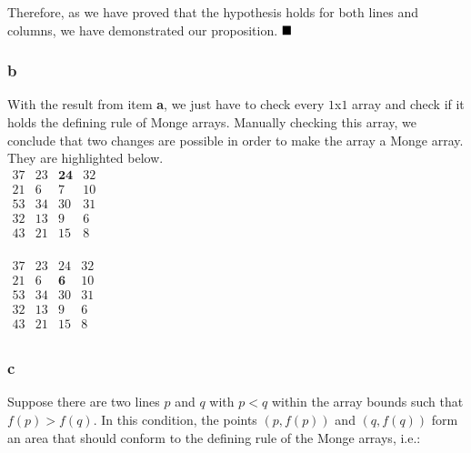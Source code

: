 \documentclass[8pt,a4paper]{article}
\begin{document}
  Therefore, as we have proved that the hypothesis holds for both lines
and columns, we have demonstrated our proposition. $\qed$

\subsubsection*{b}

  With the result from item \textbf{a}, we just have to check every $1$x$1$
array and check if it holds the defining rule of Monge arrays. Manually
checking this array, we conclude that two changes are possible in order
to make the array a Monge array. They are highlighted below. \\

\begin{math}
  \begin{matrix}
    37 & 23 & \mathbf{24} & 32 \\
    21 &  6 &  7          & 10 \\
    53 & 34 & 30          & 31 \\
    32 & 13 &  9          &  6 \\
    43 & 21 & 15          &  8 \\
  \end{matrix}
\end{math}

\vspace{0.5cm}

\begin{math}
  \begin{matrix}
    37 & 23 & 24          & 32 \\
    21 &  6 &  \mathbf{6} & 10 \\
    53 & 34 & 30          & 31 \\
    32 & 13 &  9          &  6 \\
    43 & 21 & 15          &  8 \\
  \end{matrix}
\end{math}

\subsubsection*{c}

  Suppose there are two lines $p$ and $q$ with $p < q$ within the array bounds
such that $f(p) > f(q)$. In this condition, the points $(p, f(p))$ and $(q, f(q))$
form an area that should conform to the defining rule of the Monge arrays, i.e.:
\end{document}
